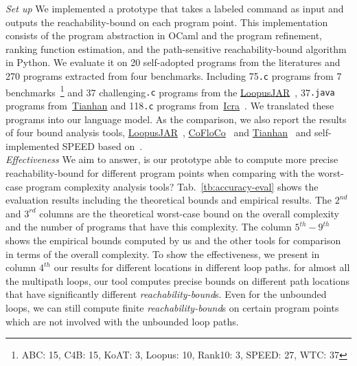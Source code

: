 \emph{Set up} We implemented a prototype {\THESYSTEM} that takes a labeled command as input 
and outputs the reachability-bound on each program point.
This implementation consists of the 
program abstraction in OCaml and the program refinement, ranking function estimation, and the path-sensitive reachability-bound algorithm in Python.
We evaluate it on 20 self-adopted programs from the literatures and 270 programs extracted from four benchmarks. 
Including 75{\tt .c} programs from 7 benchmarks~\cite{BenchmarkLoops}\footnote{ABC: 15, C4B: 15, KoAT: 3, Loopus: 10, Rank10: 3, SPEED: 27, WTC: 37} and 37 challenging{\tt .c} programs 
from the \hyperlink{https://forsyte.at/static/people/sinn/loopusJAR/index.html}{LoopusJAR}~\cite{BenchmarkLoops,SinnZV17},
37{\tt .java} programs from~\hyperlink{https://zenodo.org/record/5140586\#.Y5pBoC-B1QI}{Tianhan}\cite{BenchmarkTianhan,LuCT21}
and 118{\tt .c} programs from~\hyperlink{https://github.com/icra-team/icra}{Icra}~\cite{BenchmarkIcra,KincaidBCR19,CyphertBKR19}.
We translated these programs into our language model.
As the comparison, we also report the results of four bound analysis tools, 
\hyperlink{https://forsyte.at/software/loopus/}{LoopusJAR}~\cite{SinnZV17},
\hyperlink{https://github.com/aeflores/CoFloCo/tree/master/src}{CoFloCo}~\cite{ToolCofloco,Montoya17,Flores-Montoya16,Flores-MontoyaH14}
and \hyperlink{https://zenodo.org/record/5140586\#.Y5pBoC-B1QI}{Tianhan}~\cite{BenchmarkTianhan}
and self-implemented SPEED based on~\cite{GulwaniJK09}.
\\
\emph{Effectiveness} We aim to answer, is our prototype able to compute more precise reachability-bound for different program points when comparing with the worst-case program
complexity analysis tools?
Tab.~\ref{tb:accuracy-eval} shows the evaluation results including the theoretical bounds and empirical results.
The $2^{nd}$ and $3^{rd}$ columns are the theoretical worst-case bound on the overall complexity and the number of programs that have this complexity. The column $5^{th}-9^{th}$ shows the empirical bounds computed by us and the other tools for comparison in terms of the overall complexity.
To show the effectiveness, 
we present in column $4^{th}$ our results for different locations in different loop paths. for almost all the multipath loops, our tool computes precise bounds on different path locations that have significantly different \emph{reachability-bound}s.
Even for the unbounded loops, we can still compute finite \emph{reachability-bound}s on certain program points which are not involved with the unbounded loop paths.
